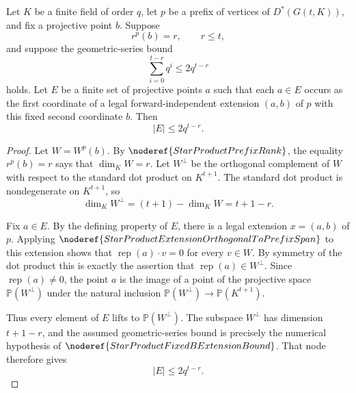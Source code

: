 \begin{helper}
Let \(K\) be a finite field of order \(q\), let \(p\) be a prefix of
vertices of \(D^*(G(t,K))\), and fix a projective point \(b\).  Suppose
\[
  r^p(b)=r,\qquad r\le t,
\]
and suppose the geometric-series bound
\[
  \sum_{i=0}^{t-r} q^i\le 2q^{t-r}
\]
holds.  Let \(E\) be a finite set of projective points \(a\) such that each
\(a\in E\) occurs as the first coordinate of a legal forward-independent
extension \((a,b)\) of \(p\) with this fixed second coordinate \(b\).  Then
\[
  |E|\le 2q^{t-r}.
\]
\end{helper}
\begin{proof}
Let \(W=W^p(b)\).  By \(\noderef{StarProductPrefixRank}\), the equality
\(r^p(b)=r\) says that \(\dim_K W=r\).  Let \(W^\perp\) be the orthogonal
complement of \(W\) with respect to the standard dot product on
\(K^{t+1}\).  The standard dot product is nondegenerate on \(K^{t+1}\), so
\[
  \dim_K W^\perp=(t+1)-\dim_K W=t+1-r.
\]

Fix \(a\in E\).  By the defining property of \(E\), there is a legal
extension \(x=(a,b)\) of \(p\).  Applying
\(\noderef{StarProductExtensionOrthogonalToPrefixSpan}\) to this extension
shows that \(\operatorname{rep}(a)\cdot v=0\) for every \(v\in W\).  By
symmetry of the dot product this is exactly the assertion that
\(\operatorname{rep}(a)\in W^\perp\).  Since \(\operatorname{rep}(a)\ne0\),
the point \(a\) is the image of a point of the projective space
\(\mathbb P(W^\perp)\) under the natural inclusion
\(\mathbb P(W^\perp)\to\mathbb P(K^{t+1})\).

Thus every element of \(E\) lifts to \(\mathbb P(W^\perp)\).  The subspace
\(W^\perp\) has dimension \(t+1-r\), and the assumed geometric-series bound
is precisely the numerical hypothesis of
\(\noderef{StarProductFixedBExtensionBound}\).  That node therefore gives
\[
  |E|\le 2q^{t-r}.
\]
\end{proof}
